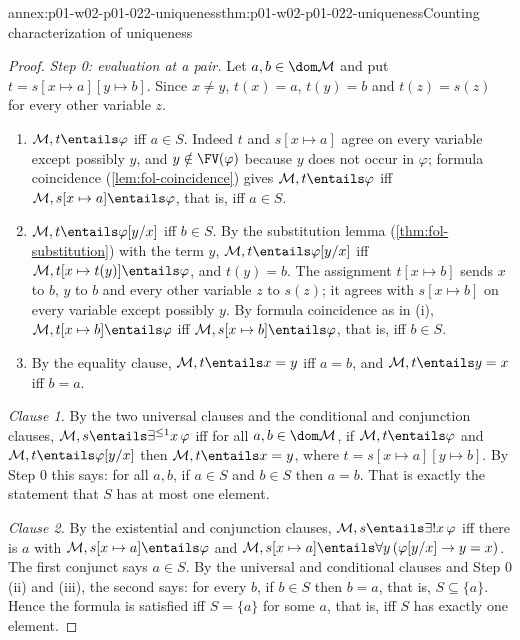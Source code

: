 \begin{annexitem}{annex:p01-w02-p01-022-uniqueness}{thm:p01-w02-p01-022-uniqueness}{Counting characterization of uniqueness}
\begin{proof}
\emph{Step 0: evaluation at a pair.} Let \(a,b\in\dom\mathcal M\) and put
\(t=s[x\mapsto a][y\mapsto b]\). Since \(x\ne y\), \(t(x)=a\), \(t(y)=b\) and
\(t(z)=s(z)\) for every other variable \(z\).
\begin{enumerate}
  \item[(i)] \(\mathcal M,t\entails\varphi\) iff \(a\in S\). Indeed \(t\)
        and \(s[x\mapsto a]\) agree on every variable except possibly \(y\),
        and \(y\notin\FV(\varphi)\) because \(y\) does not occur in
        \(\varphi\); formula coincidence (\cref{lem:fol-coincidence}) gives
        \(\mathcal M,t\entails\varphi\) iff
        \(\mathcal M,s[x\mapsto a]\entails\varphi\), that is, iff \(a\in S\).
  \item[(ii)] \(\mathcal M,t\entails\varphi[y/x]\) iff \(b\in S\). By the
        substitution lemma (\cref{thm:fol-substitution}) with the term \(y\),
        \(\mathcal M,t\entails\varphi[y/x]\) iff
        \(\mathcal M,t[x\mapsto t(y)]\entails\varphi\), and \(t(y)=b\). The
        assignment \(t[x\mapsto b]\) sends \(x\) to \(b\), \(y\) to \(b\) and
        every other variable \(z\) to \(s(z)\); it agrees with
        \(s[x\mapsto b]\) on every variable except possibly \(y\). By formula
        coincidence as in (i), \(\mathcal M,t[x\mapsto b]\entails\varphi\)
        iff \(\mathcal M,s[x\mapsto b]\entails\varphi\), that is, iff
        \(b\in S\).
  \item[(iii)] By the equality clause, \(\mathcal M,t\entails x=y\) iff
        \(a=b\), and \(\mathcal M,t\entails y=x\) iff \(b=a\).
\end{enumerate}

\emph{Clause 1.} By the two universal clauses and the conditional and
conjunction clauses, \(\mathcal M,s\entails\exists^{\leq1}x\,\varphi\) iff
for all \(a,b\in\dom\mathcal M\), if \(\mathcal M,t\entails\varphi\) and
\(\mathcal M,t\entails\varphi[y/x]\) then \(\mathcal M,t\entails x=y\),
where \(t=s[x\mapsto a][y\mapsto b]\). By Step 0 this says: for all \(a,b\),
if \(a\in S\) and \(b\in S\) then \(a=b\). That is exactly the statement that
\(S\) has at most one element.

\emph{Clause 2.} By the existential and conjunction clauses,
\(\mathcal M,s\entails\exists!x\,\varphi\) iff there is \(a\) with
\(\mathcal M,s[x\mapsto a]\entails\varphi\) and
\(\mathcal M,s[x\mapsto a]\entails\forall y\,(\varphi[y/x]\to y=x)\). The
first conjunct says \(a\in S\). By the universal and conditional clauses and
Step 0 (ii) and (iii), the second says: for every \(b\), if \(b\in S\) then
\(b=a\), that is, \(S\subseteq\{a\}\). Hence the formula is satisfied iff
\(S=\{a\}\) for some \(a\), that is, iff \(S\) has exactly one element.


\end{proof}
\end{annexitem}
